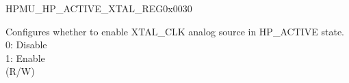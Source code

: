 \begin{register}{H}{PMU\_HP\_ACTIVE\_XTAL\_REG}{0x0030}\label{regdesc:PMUHPACTIVEXTALREG}
%
%
\regnewline%
\begin{regdesc}\begin{reglist}
\label{fielddesc:PMUHPACTIVEXPDXTAL}\item [PMU\_HP\_ACTIVE\_XPD\_XTAL] Configures whether to enable XTAL\_CLK analog source in HP\_ACTIVE state.\\
0: Disable\\
1: Enable\\
(R/W)
\end{reglist}\end{regdesc}
\end{register}


